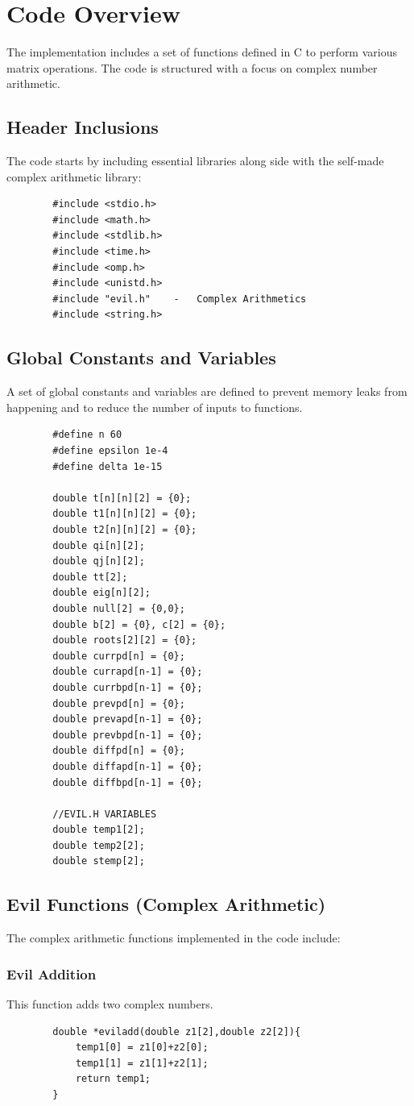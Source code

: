 \documentclass[12pt]{article}
\begin{document}
	\section{Code Overview}
	The implementation includes a set of functions defined in C to perform various matrix operations. The code is structured with a focus on complex number arithmetic.
	
	\subsection{Header Inclusions}
	The code starts by including essential libraries along side with the self-made complex arithmetic library:
	\begin{lstlisting}
		#include <stdio.h>
		#include <math.h>
		#include <stdlib.h>
		#include <time.h>
		#include <omp.h>
		#include <unistd.h>
		#include "evil.h"    -   Complex Arithmetics
		#include <string.h>
	\end{lstlisting}
	
	\subsection{Global Constants and Variables}
	A set of global constants and variables are defined to prevent memory leaks from happening and to reduce the number of inputs to functions.
	\begin{lstlisting}
		#define n 60
		#define epsilon 1e-4
		#define delta 1e-15
		
		double t[n][n][2] = {0};
		double t1[n][n][2] = {0};
		double t2[n][n][2] = {0};
		double qi[n][2];
		double qj[n][2];
		double tt[2];
		double eig[n][2];
		double null[2] = {0,0};
		double b[2] = {0}, c[2] = {0};
		double roots[2][2] = {0};
		double currpd[n] = {0};
		double currapd[n-1] = {0};
		double currbpd[n-1] = {0};
		double prevpd[n] = {0};
		double prevapd[n-1] = {0};
		double prevbpd[n-1] = {0};
		double diffpd[n] = {0};
		double diffapd[n-1] = {0};
		double diffbpd[n-1] = {0};
		
		//EVIL.H VARIABLES
		double temp1[2];     
		double temp2[2];
		double stemp[2];
	\end{lstlisting}
	\subsection{Evil Functions (Complex Arithmetic)}
	The complex arithmetic functions implemented in the code include:
	
	\subsubsection{Evil Addition}
	This function adds two complex numbers.
	\begin{lstlisting}
		double *eviladd(double z1[2],double z2[2]){
			temp1[0] = z1[0]+z2[0];
			temp1[1] = z1[1]+z2[1];
			return temp1;
		}
	\end{lstlisting}
\end{document}

